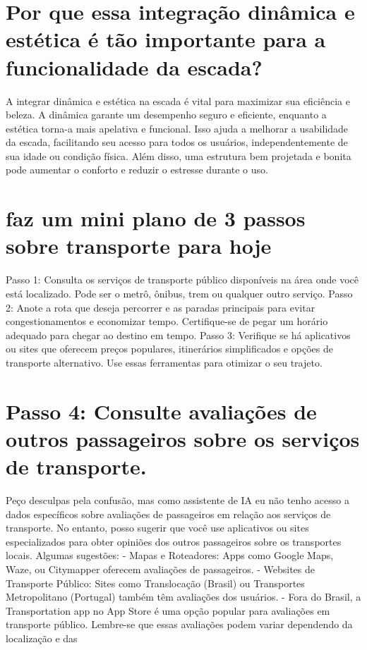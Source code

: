 \documentclass[11pt,a4paper]{article}
\begin{document}
\section{Por que essa integração dinâmica e estética é tão importante para a funcionalidade da escada?}
A integrar dinâmica e estética na escada é vital para maximizar sua eficiência e beleza. A dinâmica garante um desempenho seguro e eficiente, enquanto a estética torna-a mais apelativa e funcional. Isso ajuda a melhorar a usabilidade da escada, facilitando seu acesso para todos os usuários, independentemente de sua idade ou condição física. Além disso, uma estrutura bem projetada e bonita pode aumentar o conforto e reduzir o estresse durante o uso.

\section{faz um mini plano de 3 passos sobre transporte para hoje}
Passo 1: Consulta os serviços de transporte público disponíveis na área onde você está localizado. Pode ser o metrô, ônibus, trem ou qualquer outro serviço. Passo 2: Anote a rota que deseja percorrer e as paradas principais para evitar congestionamentos e economizar tempo. Certifique-se de pegar um horário adequado para chegar ao destino em tempo. Passo 3: Verifique se há aplicativos ou sites que oferecem preços populares, itinerários simplificados e opções de transporte alternativo. Use essas ferramentas para otimizar o seu trajeto.

\section{Passo 4: Consulte avaliações de outros passageiros sobre os serviços de transporte.}
Peço desculpas pela confusão, mas como assistente de IA eu não tenho acesso a dados específicos sobre avaliações de passageiros em relação aos serviços de transporte. No entanto, posso sugerir que você use aplicativos ou sites especializados para obter opiniões dos outros passageiros sobre os transportes locais. Algumas sugestões: - Mapas e Roteadores: Apps como Google Maps, Waze, ou Citymapper oferecem avaliações de passageiros. - Websites de Transporte Público: Sites como Translocação (Brasil) ou Transportes Metropolitano (Portugal) também têm avaliações dos usuários. - Fora do Brasil, a Transportation app no App Store é uma opção popular para avaliações em transporte público. Lembre-se que essas avaliações podem variar dependendo da localização e das
\end{document}

